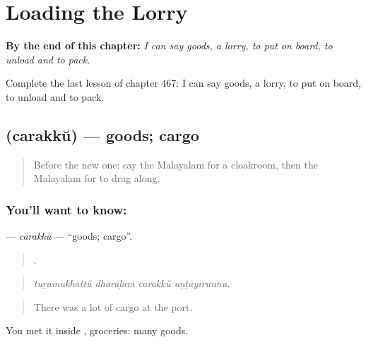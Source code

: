 
\chapter{Loading the Lorry}
\label{ch:ml-loading-the-lorry}

\begin{chapteropening}
\textbf{By the end of this chapter:} \emph{I can say goods, a lorry, to put on board, to unload and to pack.}

Complete the last lesson of chapter 467: I can say goods, a lorry, to put on board, to unload and to pack.
\end{chapteropening}

\section[\texorpdfstring{\ml{ചരക്ക്} (carakkŭ)}{ചരക്ക് (carakkŭ)}]{ (carakkŭ) — goods; cargo}

\label{lesson:ML-C467-carakku}



\begin{quote}
Before the new one: say the Malayalam for a cloakroom, then the Malayalam for to drag along.
\end{quote}

\subsection*{You'll want to know: }
\textbf{} — \emph{carakkŭ} — \textquotedblleft{}goods; cargo\textquotedblright{}.

\begin{quote}
   .
\end{quote}

\begin{quote}
\emph{tuṟamukhattŭ dhārāḷaṁ carakkŭ uṇṭāyirunnu.}
\end{quote}

\begin{quote}
There was a lot of cargo at the port.
\end{quote}

You met it inside , groceries: many goods.

